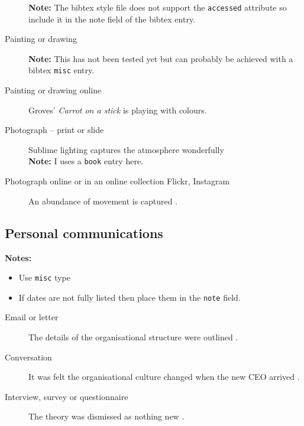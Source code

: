 \documentclass[12pt,oneside]{book} %
\begin{document}
\begin{description}
\textbf{Note:} The bibtex style file does not support the \texttt{accessed} attribute so include it in the note field of the bibtex entry.
\item[Painting or drawing] \textbf{Note:} This has not been tested yet but can probably be achieved with a bibtex \verb#misc# entry.
\item[Painting or drawing online] Groves’ {\em Carrot on a stick} \cite{groves_carrot_2007} is playing with colours. 
\item[Photograph – print or slide] 
Sublime lighting captures the atmosphere
wonderfully \cite{collins_pictures_2010}\\
\textbf{Note:} I uses a \texttt{book} entry here.
\item[Photograph online or in an online collection \eg Flickr, Instagram] An abundance of movement is
captured \cite{rush_running_1997}.
\end{description}


\subsection{Personal communications}
\textbf{Notes:}\\
\begin{itemize}
\item Use \texttt{misc} type
\item If dates are not fully listed then place them in the \texttt{note} field.
\end{itemize}
\begin{description}
\item[Email or letter] The details of the organisational structure
were outlined \cite{godfrey_restructure_nodate}.
\item[Conversation] It was felt the organisational culture
changed when the new CEO arrived \cite{williams_conversation_nodate}.
\item[Interview, survey or questionnaire] The theory was dismissed as
nothing new \cite{benson_should_nodate}.
\end{description}
\end{document}
